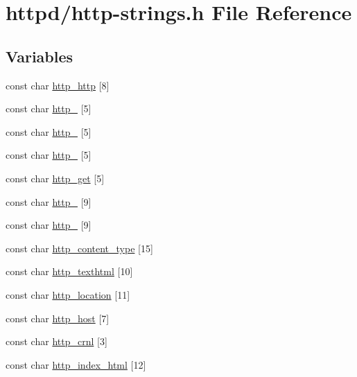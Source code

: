 \hypertarget{http-strings_8h}{
\section{httpd/http-\/strings.h File Reference}
\label{http-strings_8h}
}
\subsection*{Variables}
\begin{DoxyCompactItemize}
\item 
const char \hyperlink{http-strings_8h_acaaccd24059edb3f7a8182b1d6b83c78}{http\_\-http} \mbox{[}8\mbox{]}
\item 
const char \hyperlink{http-strings_8h_a051b06f37d5b16df80d17fb10e858c29}{http\_} \mbox{[}5\mbox{]}
\item 
const char \hyperlink{http-strings_8h_af9f47cee12d80f0e2b624264187fe87e}{http\_} \mbox{[}5\mbox{]}
\item 
const char \hyperlink{http-strings_8h_a274fe490acb83731df70a98d4954ad9d}{http\_} \mbox{[}5\mbox{]}
\item 
const char \hyperlink{http-strings_8h_aeab14be7c9393694bc1d1e858cd0f512}{http\_\-get} \mbox{[}5\mbox{]}
\item 
const char \hyperlink{http-strings_8h_a53c130cd156bfd5adeb5f7e4cc5967e4}{http\_} \mbox{[}9\mbox{]}
\item 
const char \hyperlink{http-strings_8h_a9bc6680c526e8354582bb9f71c50710f}{http\_} \mbox{[}9\mbox{]}
\item 
const char \hyperlink{http-strings_8h_a1efed1f3f714de7d7748f67613286228}{http\_\-content\_\-type} \mbox{[}15\mbox{]}
\item 
const char \hyperlink{http-strings_8h_a0b945415ffe9889bcc9f876fbf332134}{http\_\-texthtml} \mbox{[}10\mbox{]}
\item 
const char \hyperlink{http-strings_8h_ae44cdccc053a527b644269f796af7e62}{http\_\-location} \mbox{[}11\mbox{]}
\item 
const char \hyperlink{http-strings_8h_a61e4dca10281be3a140757f3d8fbf019}{http\_\-host} \mbox{[}7\mbox{]}
\item 
const char \hyperlink{http-strings_8h_af2e1f75e5b640c00f89dd6d9598d08a2}{http\_\-crnl} \mbox{[}3\mbox{]}
\item 
const char \hyperlink{http-strings_8h_ae3489af8c42b05e3c9f786e3f7be2d2f}{http\_\-index\_\-html} \mbox{[}12\mbox{]}
\item 

\end{DoxyCompactItemize}
